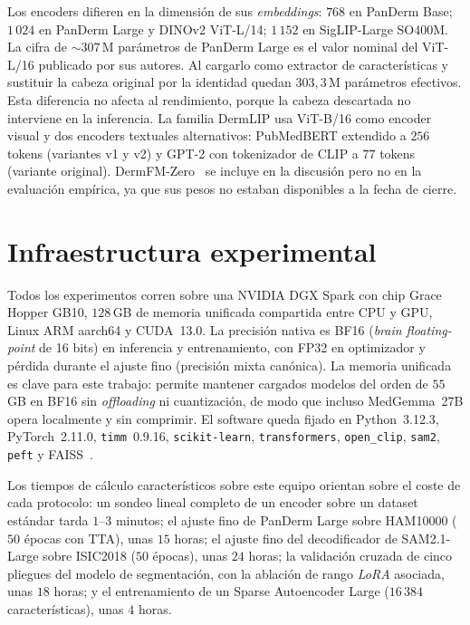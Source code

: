 Los encoders difieren en la dimensión de sus \emph{embeddings}:
$768$ en PanDerm Base; $1\,024$ en PanDerm Large y DINOv2
ViT-L/14; $1\,152$ en SigLIP-Large SO400M. La cifra de
$\sim 307$\,M parámetros de PanDerm Large es el valor nominal del
ViT-L/16 publicado por sus autores. Al cargarlo como extractor de
características y sustituir la cabeza original por la identidad
quedan $303{,}3$\,M parámetros efectivos. Esta diferencia no afecta
al rendimiento, porque la cabeza descartada no interviene en la
inferencia. La familia DermLIP usa ViT-B/16 como encoder visual y
dos encoders textuales alternativos: PubMedBERT extendido a $256$
tokens (variantes v1 y v2) y GPT-2 con tokenizador de CLIP a $77$
tokens (variante original). DermFM-Zero~\cite{dermfmzero2026} se
incluye en la discusión pero no en la evaluación empírica, ya que
sus pesos no estaban disponibles a la fecha de cierre.

\section{Infraestructura experimental}
\label{sec:infraestructura}

Todos los experimentos corren sobre una NVIDIA DGX Spark con chip
Grace Hopper GB10, $128$\,GB de memoria unificada compartida entre
CPU y GPU, Linux ARM aarch64 y CUDA~13.0. La precisión nativa es
BF16 (\emph{brain floating-point} de 16 bits) en inferencia y
entrenamiento, con FP32 en optimizador y pérdida durante el ajuste
fino (precisión mixta canónica). La memoria unificada es clave para
este trabajo: permite mantener cargados modelos del orden de
$55$\,GB en BF16 sin \emph{offloading} ni cuantización, de modo
que incluso MedGemma~27B opera localmente y sin comprimir. El
software queda fijado en Python~3.12.3, PyTorch~2.11.0,
\texttt{timm}~0.9.16, \texttt{scikit-learn}, \texttt{transformers},
\texttt{open\_clip}, \texttt{sam2}, \texttt{peft} y
FAISS~\cite{faiss2019}.

Los tiempos de cálculo característicos sobre este equipo orientan
sobre el coste de cada protocolo: un sondeo lineal completo de un
encoder sobre un dataset estándar tarda $1$--$3$ minutos; el
ajuste fino de PanDerm Large sobre HAM10000 ($50$ épocas con TTA),
unas $15$ horas; el ajuste fino del decodificador de SAM2.1-Large
sobre ISIC2018 ($50$ épocas), unas $24$ horas; la validación
cruzada de cinco pliegues del modelo de segmentación, con la
ablación de rango \emph{LoRA} asociada, unas $18$ horas; y el
entrenamiento de un Sparse Autoencoder Large ($16\,384$
características), unas $4$ horas.

